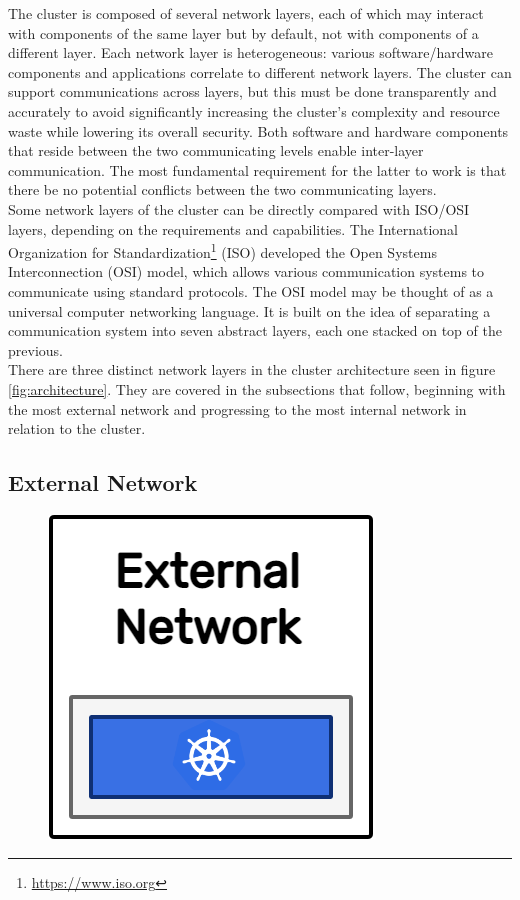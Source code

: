 The cluster is composed of several network layers, each of which may interact
with components of the same layer but by default, not with components of a different
layer. Each network layer is heterogeneous: various software/hardware components
and applications correlate to different network layers. The cluster can support
communications across layers, but this must be done transparently and accurately
to avoid significantly increasing the cluster's complexity and resource waste while
lowering its overall security. Both software and hardware components that reside
between the two communicating levels enable inter-layer communication. The most fundamental
requirement for the latter to work is that there be no potential conflicts between
the two communicating layers. \\ %
Some network layers of the cluster can be directly compared with ISO/OSI layers,
depending on the requirements and capabilities. The International Organization for
Standardization\footnote{\url{https://www.iso.org}} (ISO) developed the Open Systems
Interconnection (OSI) model, which allows various communication systems to
communicate using standard protocols. The OSI model may be thought of as a universal
computer networking language. It is built on the idea of separating a
communication system into seven abstract layers, each one stacked on top of the previous\cite{osi}.
\\ %
There are three distinct network layers in the cluster architecture seen in
figure \ref{fig:architecture}. They are covered in the subsections that follow,
beginning with the most external network and progressing to the most internal
network in relation to the cluster.

\subsection{External Network}
\label{subsec:architecture_network_external_network}

\begin{figure}
  \centering
  \includegraphics[width=.2\textwidth]{images/architecture/external_network.png}
\end{figure}

